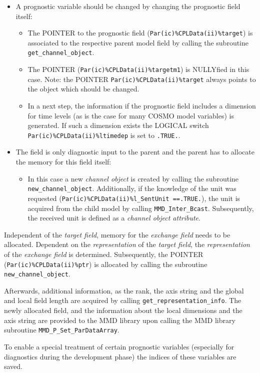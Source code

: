 \documentclass[11pt,twoside]{article}
\begin{document}
\begin{itemize}
\begin{enumerate}
\begin{itemize}
\item A prognostic variable should be changed by changing the prognostic field
itself:\\
\begin{itemize}%
\item The {\footnotesize POINTER} to the prognostic field (\verb|Par(ic)%CPLData(ii)%target|)
 is associated to the respective parent
 model field by calling the subroutine \verb|get_channel_object|.
\item The {\footnotesize POINTER}  (\verb|Par(ic)%CPLData(ii)%targetm1|) is NULLYfied in this 
case. Note: the {\footnotesize POINTER} \verb|Par(ic)%CPLData(ii)%target| always points to the 
object which should be changed.
 
\item In a next step, the information if the prognostic field includes a
 dimension for time levels (as is the case for many COSMO model variables)
 is generated. If such a dimension exists the {\footnotesize LOGICAL }switch 
\verb|Par(ic)%CPLData(ii)%ltimedep| is set to \verb|.TRUE.|.
\end{itemize} %
\item The field is only diagnostic input to the parent and the parent
 has to allocate the memory for this field itself:\\
\begin{itemize}%
\item In this case a new {\it channel object} is created by
calling the subroutine \verb|new_channel_object|. Additionally, if the
knowledge of the unit was requested 
(\verb|Par(ic)%CPLData(ii)%l_SentUnit ==.TRUE.|), the unit is acquired from
the child model by calling \verb|MMD_Inter_Bcast|. Subsequently, the received
unit is defined as a {\it channel object attribute}.
\end{itemize} %
\end{itemize}%
Independent of the {\it target field}, memory for the {\it exchange field}
needs to be 
allocated. Dependent on the {\it representation} of the {\it target field},
the {\it representation} of the {\it exchange field} is determined.
Subsequently, the {\footnotesize POINTER} (\verb|Par(ic)%CPLData(ii)%ptr|) is allocated by
calling the subroutine \verb|new_channel_object|. 
\end{enumerate}%

Afterwards, additional
information, as the rank, the axis string and the global and local field
length are acquired by calling \verb|get_representation_info|.
The newly allocated field, and the information about the local dimensions and
the axis string are provided to the MMD library upon calling the MMD library
subroutine \verb|MMD_P_Set_ParDataArray|.

To enable a special treatment of certain prognostic variables (especially for
diagnostics during the development phase) the indices of these variables are
saved.

\end{itemize}%
\end{document}
